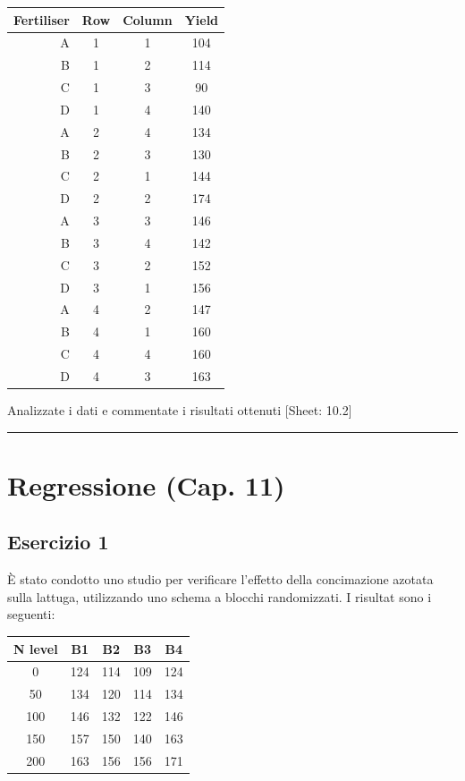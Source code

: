 \documentclass[a4paper,12pt,oneside]{book}
\begin{document}
\begin{longtable}[]{@{}rccc@{}}
\toprule()
Fertiliser & Row & Column & Yield \\
\midrule()
\endhead
A & 1 & 1 & 104 \\
B & 1 & 2 & 114 \\
C & 1 & 3 & 90 \\
D & 1 & 4 & 140 \\
A & 2 & 4 & 134 \\
B & 2 & 3 & 130 \\
C & 2 & 1 & 144 \\
D & 2 & 2 & 174 \\
A & 3 & 3 & 146 \\
B & 3 & 4 & 142 \\
C & 3 & 2 & 152 \\
D & 3 & 1 & 156 \\
A & 4 & 2 & 147 \\
B & 4 & 1 & 160 \\
C & 4 & 4 & 160 \\
D & 4 & 3 & 163 \\
\bottomrule()
\end{longtable}

Analizzate i dati e commentate i risultati ottenuti
{[}Sheet: 10.2{]}

\begin{center}\rule{0.5\linewidth}{0.5pt}\end{center}

\hypertarget{regressione-cap.-11}{%
\section{Regressione (Cap. 11)}\label{regressione-cap.-11}}

\hypertarget{esercizio-1-7}{%
\subsection{Esercizio 1}\label{esercizio-1-7}}

È stato condotto uno studio per verificare l'effetto della concimazione azotata sulla lattuga, utilizzando uno schema a blocchi randomizzati. I risultat sono i seguenti:

\begin{longtable}[]{@{}ccccc@{}}
\toprule()
N level & B1 & B2 & B3 & B4 \\
\midrule()
\endhead
0 & 124 & 114 & 109 & 124 \\
50 & 134 & 120 & 114 & 134 \\
100 & 146 & 132 & 122 & 146 \\
150 & 157 & 150 & 140 & 163 \\
200 & 163 & 156 & 156 & 171 \\
\bottomrule()
\end{longtable}
\end{document}
